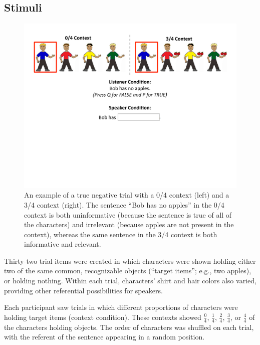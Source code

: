 \documentclass[man, noapacite]{apa2}
\begin{document}
\subsection{Stimuli}

\begin{figure}[t]
\begin{center} 
\includegraphics[width=6in]{figures/trialfig.pdf}
\caption{\label{fig:trial} An example of a true negative trial with a 0/4 context (left) and a 3/4 context (right).  The sentence ``Bob has no apples'' in the 0/4 context is both uninformative (because the sentence is true of all of the characters) and irrelevant (because apples are not present in the context), whereas the same sentence in the 3/4 context is both informative and relevant. }
\vspace{-5mm}
\end{center} 
\end{figure}

Thirty-two trial items were created in which characters were shown holding either two of the same common, recognizable objects (``target items''; e.g., two apples), or holding nothing. Within each trial, characters' shirt and hair colors also varied, providing other referential possibilities for speakers. 

Each participant saw trials in which different proportions of characters were holding target items (context condition).  These contexts showed $\frac{0}{4}$, $\frac{1}{4}$, $\frac{2}{4}$, $\frac{3}{4}$, or $\frac{4}{4}$ of the characters holding objects. The order of characters was shuffled on each trial, with the referent of the sentence appearing in a random position. 
\end{document}
